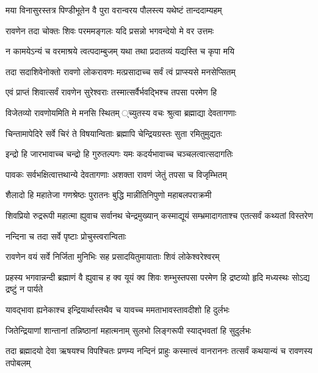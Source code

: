 \twolineshloka
{मया विनासुरस्तत्र पिण्डीभूतेन वै पुरा}
{वरान्वरय पौलस्त्य यथेष्टं तान्ददाम्यहम्}%

\twolineshloka
{रावणेन तदा चोक्तः शिवः परममङ्गलः}
{यदि प्रसन्नो भगवन्देयो मे वर उत्तमः}%

\twolineshloka
{न कामयेऽन्यं च वरमाश्रये त्वत्पदाम्बुजम्}
{यथा तथा प्रदातव्यं यद्यस्ति च कृपा मयि}%

\twolineshloka
{तदा सदाशिवेनोक्तो रावणो लोकरावणः}
{मत्प्रसादाच्च सर्वं त्वं प्राप्स्यसे मनसेप्सितम्}%

\twolineshloka
{एवं प्राप्तं शिवात्सर्वं रावणेन सुरेश्वराः}
{तस्मात्सर्वैर्भवद्भिश्च तपसा परमेण हि}%

\twolineshloka
{विजेतव्यो रावणोयमिति मे मनसि स्थितम्}
{्च्युतस्य वचः श्रुत्वा ब्रह्माद्या देवतागणाः}%

\twolineshloka
{चिन्तामापेदिरे सर्वे चिरं ते विषयान्विताः}
{ब्रह्मापि चेन्द्रियग्रस्तः सुता रमितुमुद्यतः}%

\twolineshloka
{इन्द्रो हि जारभावाच्च चन्द्रो हि गुरुतल्पगः}
{यमः कदर्यभावाच्च चञ्चलत्वात्सदागतिः}%

\twolineshloka
{पावकः सर्वभक्षित्वात्तथान्ये देवतागणाः}
{अशक्ता रावणं जेतुं तपसा च विजृम्भितम्}%

\twolineshloka
{शैलादो हि महातेजा गणश्रेष्ठः पुरातनः}
{बुद्धि मान्नीतिनिपुणो महाबलपराक्रमी}%

\twolineshloka
{शिवप्रियो रुद्ररूपी महात्मा ह्युवाच सर्वानथ चेन्द्रमुख्यान्}
{कस्माद्यूयं सम्भ्रमादागताश्च एतत्सर्वं कथ्यतां विस्तरेण}%

\onelineshloka
{नन्दिना च तदा सर्वे पृष्टाः प्रोचुस्त्वरान्विताः}%


\twolineshloka
{रावणेन वयं सर्वे निर्जिता मुनिभिः सह}
{प्रसादयितुमायाताः शिवं लोकेश्वरेश्वरम्}%

\threelineshloka
{प्रहस्य भगवान्नन्दी ब्रह्माणं वै ह्युवाच ह}
{क्व यूयं क्व शिवः शम्भुस्तपसा परमेण हि}
{द्रष्टव्यो हृदि मध्यस्थः सोऽद्य द्रष्टुं न पार्यते}%

\twolineshloka
{यावद्भावा ह्यनेकाश्च इन्द्रियार्थास्तथैव च}
{यावच्च ममताभावस्तावदीशो हि दुर्लभः}%

\twolineshloka
{जितेन्द्रियाणां शान्तानां तन्निष्ठानां महात्मनाम्}
{सुलभो लिङ्गरूपी स्याद्भवतां हि सुदुर्लभः}%

\threelineshloka
{तदा ब्रह्मादयो देवा ऋषयश्च विपश्चितः}
{प्रणम्य नन्दिनं प्राहुः कस्मात्त्वं वानराननः}
{तत्सर्वं कथयान्यं च रावणस्य तपोबलम्}%

